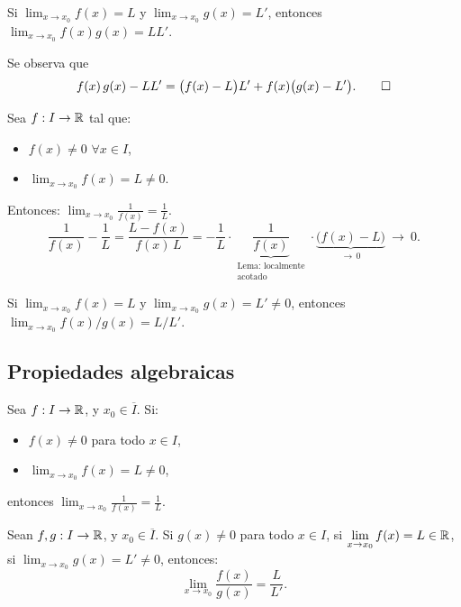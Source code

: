 \documentclass[11pt,a4paper]{article}
\newcommand{\Cl}[1]{\overline{#1}}      %
\begin{document}
\begin{proposicion}
Si $\displaystyle\lim_{x\to x_0}f(x)=L$ y $\displaystyle\lim_{x\to x_0}g(x)=L'$, entonces $\displaystyle\lim_{x\to x_0}f(x)g(x)=LL'$.
\end{proposicion}

\begin{demo}
Se observa que
\[
  f(x)\,g(x)-LL' = \big(f(x)-L\big)L' + f(x)\big(g(x)-L'\big). \qedhere
\]
\end{demo}

\begin{proposicion}
Sea $f:I\to\mathbb{R}$ tal que:
\begin{itemize}
  \item $f(x)\neq0$ $\forall x\in I$,
  \item $\displaystyle\lim_{x\to x_0}f(x)=L\neq0$.
\end{itemize}
Entonces: $\displaystyle\lim_{x\to x_0}\frac{1}{f(x)}=\frac1L$.
\[
  \frac{1}{f(x)}-\frac1L = \frac{L-f(x)}{f(x)\,L}
  = -\frac1L\cdot\underbrace{\frac{1}{f(x)}}_{\substack{\text{Lema: localmente}\\\text{acotado}}}\cdot\underbrace{\big(f(x)-L\big)}_{\to\,0}\ \to\ 0.
\]
\end{proposicion}

\begin{proposicion}
Si $\displaystyle\lim_{x\to x_0}f(x)=L$ y $\displaystyle\lim_{x\to x_0}g(x)=L'\neq0$, entonces $\displaystyle\lim_{x\to x_0}f(x)/g(x)=L/L'$.
\end{proposicion}


\subsection{Propiedades algebraicas}

\begin{proposicion}\label{prop:inversa}
Sea $f:I\to\mathbb{R}$, y $x_0\in\Cl{I}$. Si:
\begin{itemize}
  \item $f(x)\neq0$ para todo $x\in I$,
  \item $\displaystyle\lim_{x\to x_0}f(x)=L\neq0$,
\end{itemize}
entonces $\displaystyle\lim_{x\to x_0}\frac{1}{f(x)}=\frac1L$.
\end{proposicion}

\begin{corolario}
Sean $f,g:I\to\mathbb{R}$, y $x_0\in\Cl{I}$. Si $g(x)\neq0$ para todo $x\in I$, si $\displaystyle\lim_{x\to x_0}f(x)=L\in\mathbb{R}$, si $\displaystyle\lim_{x\to x_0}g(x)=L'\neq0$, entonces:
\[
  \lim_{x\to x_0}\frac{f(x)}{g(x)}=\frac{L}{L'}.
\]
\end{corolario}
\end{document}
